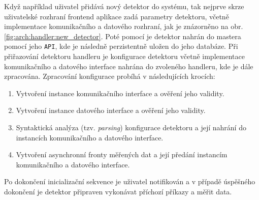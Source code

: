 Když například uživatel přidává nový detektor do systému, tak nejprve skrze uživatelské rozhraní frontend aplikace zadá parametry detektoru, včetně implementace komunikačního a datového rozhraní, jak je znázorněno na obr. \ref{fig:arch:handler:new_detector}. Poté pomocí je detektor nahrán do mastera pomocí jeho \texttt{API}, kde je následně perzistentně uložen do jeho databáze. Při přiřazování detektoru handleru je konfigurace detektoru včetně implementace komunikačního a datového interface nahrána do zvoleného handleru, kde je dále zpracována. Zpracování konfigurace probíhá v následujících krocích:
\begin{enumerate}
    \item Vytvoření instance komunikačního interface a ověření jeho validity.
    \item Vytvoření instance datového interface a ověření jeho validity.
    \item Syntaktická analýza (tzv. \textit{parsing}) konfigurace detektoru a její nahrání do instancích komunikačního a datového interface.
    \item Vytvoření asynchronní fronty měřených dat a její předání instancím komunikačního a datového interface.
\end{enumerate}
Po dokončení inicializační sekvence je uživatel notifikován a v případě úspěšného dokončení je detektor připraven vykonávat příchozí příkazy a měřit data.

